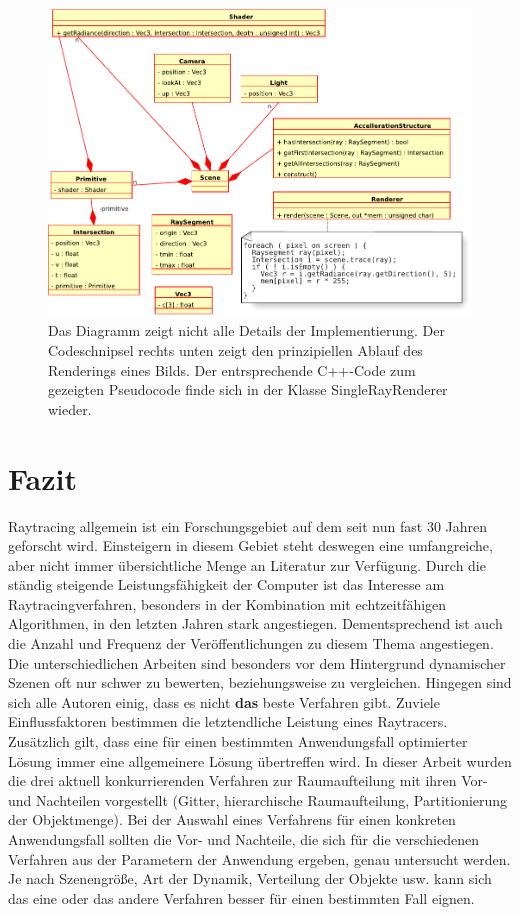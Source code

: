 \begin{figure}\centering
\includegraphics[width=1.0\textwidth]{images/basicuml.pdf} 
\caption[Diagramm der wichtigsten Klassen]{Das Diagramm zeigt nicht alle Details der Implementierung. Der Codeschnipsel rechts unten zeigt den prinzipiellen Ablauf des Renderings eines Bilds. Der entrsprechende C++-Code zum gezeigten Pseudocode finde sich in der Klasse SingleRayRenderer wieder.}
\label{fig:basicuml}
\end{figure}

\chapter{Fazit}

Raytracing allgemein ist ein Forschungsgebiet auf dem seit nun fast 30 Jahren geforscht wird. Einsteigern in diesem Gebiet steht deswegen eine umfangreiche, aber nicht immer übersichtliche Menge an Literatur zur Verfügung. Durch die ständig steigende Leistungsfähigkeit der Computer ist das Interesse am Raytracingverfahren, besonders in der Kombination mit echtzeitfähigen Algorithmen, in den letzten Jahren stark angestiegen. Dementsprechend ist auch die Anzahl und Frequenz der Veröffentlichungen zu diesem Thema angestiegen.
Die unterschiedlichen Arbeiten sind besonders vor dem Hintergrund dynamischer Szenen oft nur schwer zu bewerten, beziehungsweise zu vergleichen. Hingegen sind sich alle Autoren einig, dass es nicht \textbf{das} beste Verfahren gibt. Zuviele Einflussfaktoren bestimmen die letztendliche Leistung eines Raytracers. Zusätzlich gilt, dass eine für einen bestimmten Anwendungsfall optimierter Lösung immer eine allgemeinere Lösung übertreffen wird.
In dieser Arbeit wurden die drei aktuell konkurrierenden Verfahren zur Raumaufteilung mit ihren Vor- und Nachteilen vorgestellt (Gitter, hierarchische Raumaufteilung, Partitionierung der Objektmenge). Bei der Auswahl eines Verfahrens für einen konkreten Anwendungsfall sollten die Vor- und Nachteile, die sich für die verschiedenen Verfahren aus der Parametern der Anwendung ergeben, genau untersucht werden. Je nach Szenengröße, Art der Dynamik, Verteilung der Objekte usw. kann sich das eine oder das andere Verfahren besser für einen bestimmten Fall eignen.

